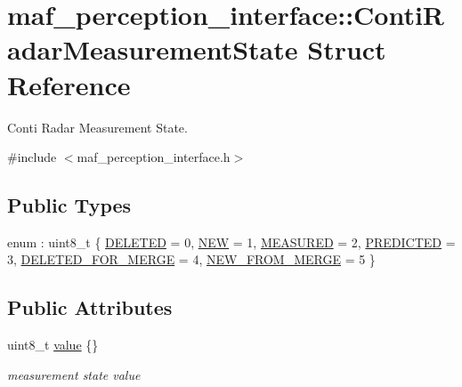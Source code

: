 \hypertarget{structmaf__perception__interface_1_1ContiRadarMeasurementState}{}\section{maf\+\_\+perception\+\_\+interface\+:\+:Conti\+Radar\+Measurement\+State Struct Reference}
\label{structmaf__perception__interface_1_1ContiRadarMeasurementState}


Conti Radar Measurement State.  




{\ttfamily \#include $<$maf\+\_\+perception\+\_\+interface.\+h$>$}

\subsection*{Public Types}
\begin{DoxyCompactItemize}
\item 
enum \+: uint8\+\_\+t \{ \newline
\hyperlink{structmaf__perception__interface_1_1ContiRadarMeasurementState_a14e6b80b1f336a29bf52018183e09f21a84de028e7292ed11dccee36d704a56a9}{D\+E\+L\+E\+T\+ED} = 0, 
\hyperlink{structmaf__perception__interface_1_1ContiRadarMeasurementState_a14e6b80b1f336a29bf52018183e09f21a7ff97535ddc5f5dff9b43f3902486315}{N\+EW} = 1, 
\hyperlink{structmaf__perception__interface_1_1ContiRadarMeasurementState_a14e6b80b1f336a29bf52018183e09f21a8e1b08f550f8d01d6a18e4a4d5803105}{M\+E\+A\+S\+U\+R\+ED} = 2, 
\hyperlink{structmaf__perception__interface_1_1ContiRadarMeasurementState_a14e6b80b1f336a29bf52018183e09f21a07644098119d9f89a640bdf38dff87ce}{P\+R\+E\+D\+I\+C\+T\+ED} = 3, 
\newline
\hyperlink{structmaf__perception__interface_1_1ContiRadarMeasurementState_a14e6b80b1f336a29bf52018183e09f21a014b44f08ef6163c9baf406e31ec3950}{D\+E\+L\+E\+T\+E\+D\+\_\+\+F\+O\+R\+\_\+\+M\+E\+R\+GE} = 4, 
\hyperlink{structmaf__perception__interface_1_1ContiRadarMeasurementState_a14e6b80b1f336a29bf52018183e09f21a4aac956f08f544f2845f82c84a5a4c28}{N\+E\+W\+\_\+\+F\+R\+O\+M\+\_\+\+M\+E\+R\+GE} = 5
 \}
\end{DoxyCompactItemize}
\subsection*{Public Attributes}
\begin{DoxyCompactItemize}
\item 
uint8\+\_\+t \hyperlink{structmaf__perception__interface_1_1ContiRadarMeasurementState_adc7b8bacf168fa28409a5de9877cdf52}{value} \{\}
\begin{DoxyCompactList}\small\item\em measurement state value \end{DoxyCompactList}\end{DoxyCompactItemize}


